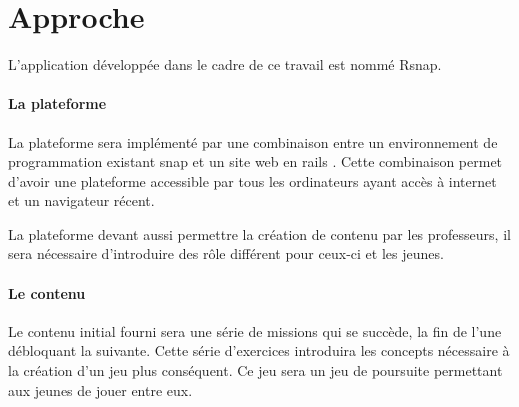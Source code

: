 \section{Approche}
\label{intro-approche}
L'application développée dans le cadre de ce travail est nommé \gls{Rsnap}.

\paragraph{La plateforme} La plateforme sera implémenté par une combinaison entre un environnement de programmation existant \gls{snap} \cite{snap} et un site web en \gls{rails} \cite{rails}. Cette combinaison permet d'avoir une plateforme accessible par tous les ordinateurs ayant accès à internet et un navigateur récent.

La plateforme devant aussi permettre la création de contenu par les professeurs, il sera nécessaire d'introduire des rôle différent pour ceux-ci et les jeunes.

\paragraph{Le contenu} Le contenu initial fourni sera une série de missions qui se succède, la fin de l'une débloquant la suivante. Cette série d'exercices introduira les concepts nécessaire à la création d'un jeu plus conséquent. Ce jeu sera un jeu de poursuite permettant aux jeunes de jouer entre eux.
